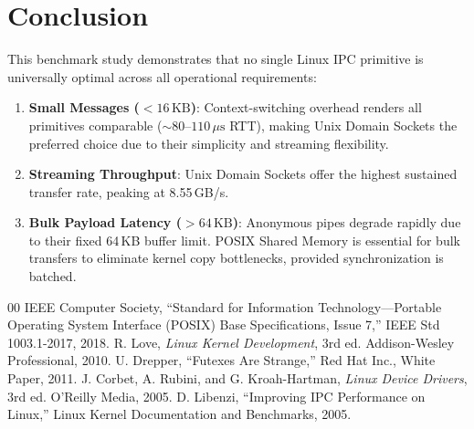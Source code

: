 \documentclass[conference]{IEEEtran}
\begin{document}
\section{Conclusion}
This benchmark study demonstrates that no single Linux IPC primitive is universally optimal across all operational requirements:
\begin{enumerate}
    \item \textbf{Small Messages ($<16\,\text{KB}$)}: Context-switching overhead renders all primitives comparable ($\sim 80$--$110\,\mu\text{s}$ RTT), making Unix Domain Sockets the preferred choice due to their simplicity and streaming flexibility.
    \item \textbf{Streaming Throughput}: Unix Domain Sockets offer the highest sustained transfer rate, peaking at 8.55\,GB/s.
    \item \textbf{Bulk Payload Latency ($>64\,\text{KB}$)}: Anonymous pipes degrade rapidly due to their fixed 64\,KB buffer limit. POSIX Shared Memory is essential for bulk transfers to eliminate kernel copy bottlenecks, provided synchronization is batched.
\end{enumerate}

\begin{thebibliography}{00}
 IEEE Computer Society, ``Standard for Information Technology---Portable Operating System Interface (POSIX) Base Specifications, Issue 7,'' IEEE Std 1003.1-2017, 2018.
 R. Love, \textit{Linux Kernel Development}, 3rd ed. Addison-Wesley Professional, 2010.
 U. Drepper, ``Futexes Are Strange,'' Red Hat Inc., White Paper, 2011.
 J. Corbet, A. Rubini, and G. Kroah-Hartman, \textit{Linux Device Drivers}, 3rd ed. O'Reilly Media, 2005.
 D. Libenzi, ``Improving IPC Performance on Linux,'' Linux Kernel Documentation and Benchmarks, 2005.
\end{thebibliography}
\end{document}
